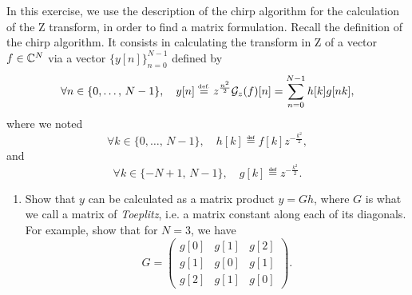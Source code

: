  
\begin{exo}
\label{exo-chirp-transform-toeplitz}
 
  In this exercise, we use the description of the chirp algorithm for the calculation of the Z transform, in order to find a matrix formulation. Recall the definition of the chirp algorithm. It consists in calculating the transform in Z of a vector $ f \in \mathbb{C}^N $ via a vector $ \{y [n] \}_{n = 0}^{N-1} $ defined by
\begin{equation*}
\forall n \in \{0, \ldots, \, N-1 \}, \quad y [n] \stackrel{\mbox{\upshape\tiny def.}}{=} z^{\frac{n^2}{2}} \mathcal{G}_z (f) [n] = \sum_{n = 0}^{N-1}{h [k] g [nk]},
\end{equation*}
where we noted
\begin{equation*}
\forall k \in \{0, \ldots, \, N-1 \}, \quad h [k] \eqdef f [k] z^{- \frac{k^2}{2}},
\end{equation*}
and
\begin{equation*}
\forall k \in \{- N + 1, \, N-1 \}, \quad g [k] \eqdef z^{- \frac{k^2}{2}}.
\end{equation*}
\begin{enumerate}
\item Show that $ y $ can be calculated as a matrix product $ y = G h $, where $ G $ is what we call a matrix of \textit{Toeplitz}, i.e. a matrix constant along each of its diagonals. For example, show that for $ N = 3 $, we have
\begin{equation*}
G = \begin{pmatrix} g [0] & g [1] & g [2] \\g [1] & g [0] & g [1] \\g [2] & g [1] & g [0] \end{pmatrix}.
\end{equation*}
 

\end{enumerate}
\end{exo}
